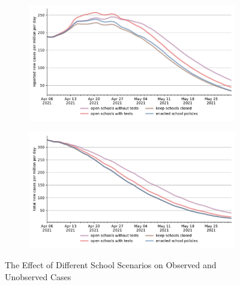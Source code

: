 \begin{figure}[ht]
  \centering
  \begin{subfigure}{.6\textwidth}
    \includegraphics[width=0.9 \textwidth]{figures/results/figures/scenario_comparisons/school_scenarios/full_new_known_case}
  \end{subfigure}%
  \begin{subfigure}{.6\textwidth}
    \includegraphics[width=0.9 \textwidth]{figures/results/figures/scenario_comparisons/school_scenarios/full_newly_infected}
  \end{subfigure}
  \caption{The Effect of Different School Scenarios on Observed and Unobserved Cases}
  \figurenotes{}
  \label{fig:appdx_school_scenarios}
\end{figure}


\FloatBarrier



\FloatBarrier
